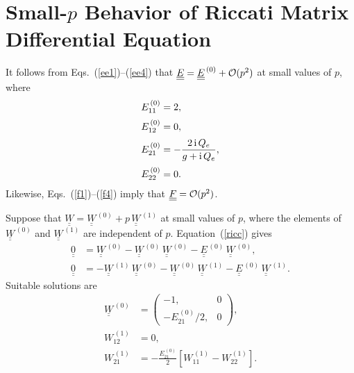 \documentclass[12pt,prb,aps,notitlepage]{revtex4-1}
\begin{document}
\section{Small-$p$ Behavior of Riccati Matrix Differential Equation}
It follows from Eqs.~(\ref{ee1})--(\ref{ee4})  that  $\underline{\underline{E}} = \underline{\underline{E}}^{\,(0)} + {\cal O}(p^2)$ at small values of $p$,
where 
\begin{align}
E_{11}^{\,(0)} &= 2,\\[0.5ex]
E_{12}^{\,(0)}&=0,\\[0.5ex]
E_{21}^{\,(0)} &= - \frac{2\,{\rm i}\,Q_e}{g+{\rm i}\,Q_e},\label{e210}\\[0.5ex]
E_{22}^{\,(0)}&= 0.
\end{align}
Likewise,  Eqs.~(\ref{f1})--(\ref{f4}) imply that $\underline{\underline{F}} ={\cal O}(p^2)$.

Suppose that  $\underline{\underline{W}}= \underline{\underline{W}}^{\,(0)}+ p\,\underline{\underline{W}}^{\,(1)}$ at small values of $p$,
where the elements of  $\underline{\underline{W}}^{\,(0)}$ and $\underline{\underline{W}}^{\,(1)}$ are independent of $p$. 
Equation~(\ref{ricc}) gives
\begin{align}
\underline{\underline{0}}&= \underline{\underline{W}}^{\,(0)}-\underline{\underline{W}}^{\,(0)}\,\underline{\underline{W}}^{\,(0)}- 
\underline{\underline{E}}^{\,(0)}\,\underline{\underline{W}}^{\,(0)},\\[0.5ex]
\underline{\underline{0}}&= -\underline{\underline{W}}^{\,(1)}\,\underline{\underline{W}}^{\,(0)}-\underline{\underline{W}}^{\,(0)}\,\underline{\underline{W}}^{\,(1)}- 
\underline{\underline{E}}^{\,(0)}\,\underline{\underline{W}}^{\,(1)}.
\end{align}
Suitable solutions are
\begin{align}\label{w0def}
\underline{\underline{W}}^{\,(0)} &=  \left(\begin{array}{cc} -1,&0\\-E_{21}^{\,(0)}/2,&0\end{array}\right),\\[0.5ex]
W_{12}^{\,(1)} &= 0,\\[0.5ex]
W_{21}^{\,(1)}& = -\frac{E_{21}^{\,(0)}}{2}\left[W_{11}^{\,(1)}- W_{22}^{\,(1)}\right].\label{w21def}
\end{align}
\end{document}
